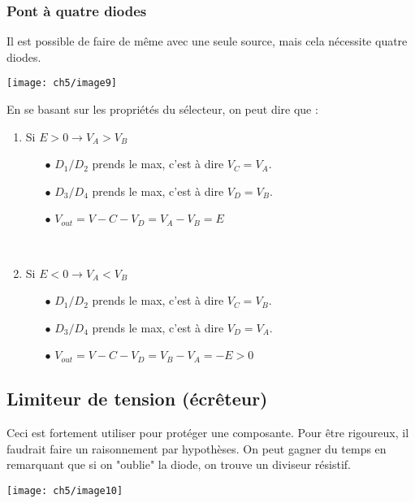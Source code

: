 			\subsubsection{Pont à quatre diodes}
			Il est possible de faire de même avec une seule source, mais cela 
			nécessite quatre diodes.
			\begin{center}
			\texttt{[image: ch5/image9]}
			\end{center}		
			En se basant sur les propriétés du sélecteur, on peut dire que :
			\begin{multicols}{2}
			\begin{enumerate}
			\item Si $E>0 \rightarrow V_A>V_B$
				\begin{itemize}
				\item[$\bullet$] $D_1/D_2$ prends le max, c'est à dire $V_C=V_A$.
				\item[$\bullet$] $D_3/D_4$ prends le max, c'est à dire $V_D=V_B$.
				\item[$\bullet$] $V_{out} = V-C-V_D = V_A-V_B=E$
				\end{itemize}\ \\
				
			\item Si $E<0 \rightarrow V_A<V_B$
				\begin{itemize}
				\item[$\bullet$] $D_1/D_2$ prends le max, c'est à dire $V_C=V_B$.
				\item[$\bullet$] $D_3/D_4$ prends le max, c'est à dire $V_D=V_A$.
				\item[$\bullet$] $V_{out} = V-C-V_D = V_B-V_A=-E >0$
				\end{itemize}			
			\end{enumerate}
			\end{multicols}
		
		\subsection{Limiteur de tension (écrêteur)}
		Ceci est fortement utiliser pour protéger une composante. Pour être rigoureux, 
		il faudrait faire un raisonnement par hypothèses. On peut gagner du temps en 
		remarquant que si on "oublie" la diode, on trouve un diviseur résistif.
					\begin{center}
			\texttt{[image: ch5/image10]}
			\end{center}		
			
